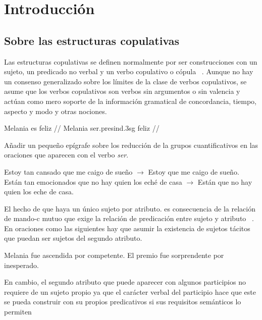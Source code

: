 \chapter{Introducción}
\vspace*{-.25in}
\section{Sobre las estructuras copulativas}
Las estructuras copulativas se definen normalmente por ser construcciones con un sujeto, un predicado no verbal y un verbo copulativo o cópula ~\autocite{Bentley20179Copular-and-}. Aunque no hay un consenso generalizado sobre los límites de la clase de verbos copulativos, se asume que los verbos copulativos son verbos sin argumentos o sin valencia y actúan como mero soporte de la información gramatical de concordancia, tiempo, aspecto y modo y otras nociones.





\ex[glspace=!1em,everygla={},everyglb={},aboveglbskip=-.2ex]
\begingl
\gla Melania es feliz //
\glb Melania ser.{\sc presind}.{\sc 3sg} feliz  //
\endgl
\xe


Añadir un pequeño epígrafe sobre los reducción de la grupos cuantificativos en las oraciones que aparecen con el verbo \textit{ser}.

\pex[*]
\a	Estoy tan cansado que me caigo de sueño $\longrightarrow$  Estoy que me caigo de sueño.
\a	Están tan emocionados que no hay quien los eché de casa $\longrightarrow$  Están que no hay quien los eche de casa.
\xe


El hecho de que haya un único sujeto por atributo. es consecuencia de la relación de mando-c mutuo que exige la relación de predicación entre sujeto y atributo ~\autocite{Williams1980Predication,Bowers1993The-Syntax-of-Predic}. En oraciones como las siguientes hay que asumir la existencia de sujetos tácitos que puedan ser sujetos del segundo atributo.

\pex[*]
\a Melania fue ascendida por competente.
\a El premio fue sorprendente por inesperado.
\xe


En cambio, el segundo atributo que puede aparecer con algunos participios no requiere de un sujeto propio ya que el carácter verbal del participio hace que este se pueda construir con su propios predicativos si sus requisitos semánticos lo permiten~\autocite{Bosque1999el-sintagma-adjetiva}


